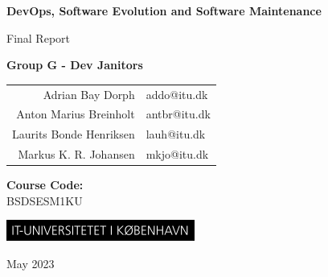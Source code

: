 \begin{titlepage}
    \begin{center}
       \vspace*{0.5cm}

        \huge
        \textbf{DevOps, Software Evolution and Software Maintenance}

        \vspace{0.5cm}
        \Large
        Final Report
            
        \vspace{1.5cm}

        \large
        \textbf{Group G - Dev Janitors} \\
        \vspace{0.25cm}
        \begin{tabular}{r l}
            Adrian Bay Dorph & addo@itu.dk        \\
            Anton Marius Breinholt & antbr@itu.dk        \\
            Laurits Bonde Henriksen & lauh@itu.dk \\
            Markus K. R. Johansen & mkjo@itu.dk   \\
        \end{tabular}

        \vspace{5cm}
        \large
        \textbf{Course Code:}\\
        BSDSESM1KU
        
        \vfill

        \includegraphics[scale=2]{report/source/images/itu_logo.png}

        \vspace{0.8cm}
        May 2023
    \end{center}
\end{titlepage}
